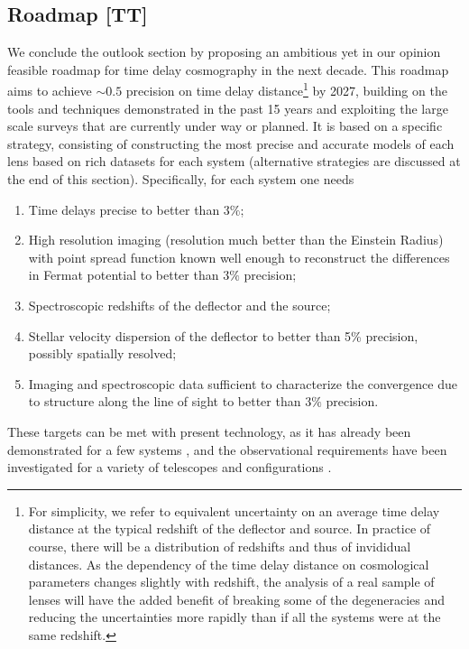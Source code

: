 \subsection{Roadmap [TT]}
\label{ssec:roadmap}

We conclude the outlook section by proposing an ambitious yet in our
opinion feasible roadmap for time delay cosmography in the next
decade. This roadmap aims to achieve $\sim0.5$ precision on time delay
distance\footnote{For simplicity, we refer to equivalent uncertainty
on an average time delay distance at the typical redshift of the
deflector and source. In practice of course, there will be a
distribution of redshifts and thus of invididual distances. As the
dependency of the time delay distance on cosmological parameters
changes slightly with redshift, the analysis of a real sample of
lenses will have the added benefit of breaking some of the
degeneracies and reducing the uncertainties more rapidly than if all
the systems were at the same redshift.} by 2027, building on the tools
and techniques demonstrated in the past 15 years and exploiting the
large scale surveys that are currently under way or planned. It is
based on a specific strategy, consisting of constructing the most
precise and accurate models of each lens based on rich datasets for
each system (alternative strategies are discussed at the end of this
section). Specifically, for each system one needs

\begin{enumerate}
\item Time delays precise to better than $3\%$;
\item High resolution imaging (resolution much better than the Einstein Radius) with point spread function known well enough to reconstruct the differences in Fermat potential to better than $3\%$ precision;
\item Spectroscopic redshifts of the deflector and the source;
\item Stellar velocity dispersion of the deflector to better than 5\% precision, possibly spatially resolved;
\item Imaging and spectroscopic data sufficient to characterize the convergence due to structure along the line of sight to better than $3\%$ precision.
\end{enumerate}

These targets can be met with present technology, as it has already
been demonstrated for a few systems \citep{Tew++13,Suy++13}, and the
observational requirements have been investigated for a variety of
telescopes and configurations
\citep{Gre++13,CollettEtal2013,Men++15,Lin15}.

